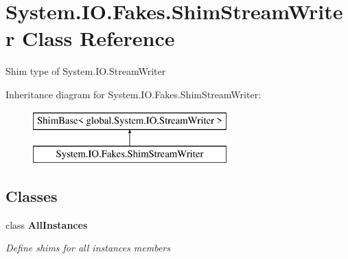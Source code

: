 \hypertarget{class_system_1_1_i_o_1_1_fakes_1_1_shim_stream_writer}{\section{System.\-I\-O.\-Fakes.\-Shim\-Stream\-Writer Class Reference}
\label{class_system_1_1_i_o_1_1_fakes_1_1_shim_stream_writer}
}


Shim type of System.\-I\-O.\-Stream\-Writer 


Inheritance diagram for System.\-I\-O.\-Fakes.\-Shim\-Stream\-Writer\-:\begin{figure}[H]
\begin{center}
\leavevmode
\includegraphics[height=2.000000cm]{class_system_1_1_i_o_1_1_fakes_1_1_shim_stream_writer}
\end{center}
\end{figure}
\subsection*{Classes}
\begin{DoxyCompactItemize}
\item 
class {\bfseries All\-Instances}
\begin{DoxyCompactList}\small\item\em Define shims for all instances members\end{DoxyCompactList}\end{DoxyCompactItemize}
